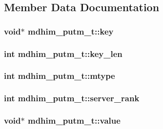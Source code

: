 \subsection{Member Data Documentation}
\hypertarget{structmdhim__putm__t_a6b5ee783b09f0039b09597e25005396e}{
\subsubsection[{key}]{\setlength{\rightskip}{0pt plus 5cm}void$\ast$ mdhim\-\_\-putm\-\_\-t\-::key}}\label{d6/dcd/structmdhim__putm__t_a6b5ee783b09f0039b09597e25005396e}
\hypertarget{structmdhim__putm__t_afbac7bbcd98d8489c502fbd6599964a0}{
\subsubsection[{key\-\_\-len}]{\setlength{\rightskip}{0pt plus 5cm}int mdhim\-\_\-putm\-\_\-t\-::key\-\_\-len}}\label{d6/dcd/structmdhim__putm__t_afbac7bbcd98d8489c502fbd6599964a0}
\hypertarget{structmdhim__putm__t_a632ccc930561029cfbbb28ec2b9929a4}{
\subsubsection[{mtype}]{\setlength{\rightskip}{0pt plus 5cm}int mdhim\-\_\-putm\-\_\-t\-::mtype}}\label{d6/dcd/structmdhim__putm__t_a632ccc930561029cfbbb28ec2b9929a4}
\hypertarget{structmdhim__putm__t_ad51fbdc39b6f3f8951b4e87a4f57e3bd}{
\subsubsection[{server\-\_\-rank}]{\setlength{\rightskip}{0pt plus 5cm}int mdhim\-\_\-putm\-\_\-t\-::server\-\_\-rank}}\label{d6/dcd/structmdhim__putm__t_ad51fbdc39b6f3f8951b4e87a4f57e3bd}
\hypertarget{structmdhim__putm__t_adac45376bec0e989940d3a2b4a374daf}{
\subsubsection[{value}]{\setlength{\rightskip}{0pt plus 5cm}void$\ast$ mdhim\-\_\-putm\-\_\-t\-::value}}\label{d6/dcd/structmdhim__putm__t_adac45376bec0e989940d3a2b4a374daf}
